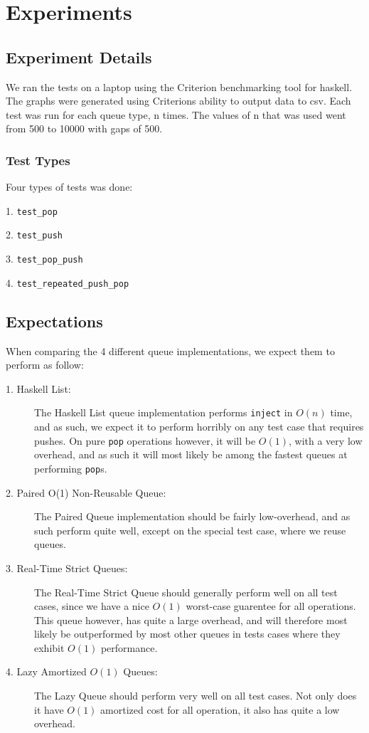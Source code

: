 \section{Experiments}
\subsection{Experiment Details}
We ran the tests on a laptop using the Criterion benchmarking tool for haskell. The graphs were generated using Criterions ability to output data to csv. Each test was run for each queue type, n times. The values of n that was used went from 500 to 10000 with gaps of 500.

\subsubsection{Test Types}
Four types of tests was done:
\begin{description}
\item{1. \texttt{test\_pop}}
\item{2. \texttt{test\_push}}
\item{3. \texttt{test\_pop\_push}}
\item{4. \texttt{test\_repeated\_push\_pop}}
\end{description}



\subsection{Expectations}
When comparing the 4 different queue implementations, we expect them to perform as follow:
\begin{description}

\item[1. Haskell List:]
The Haskell List queue implementation performs \texttt{inject} in $O(n)$ time, and as such, we expect it to perform horribly on any test case that requires pushes.
On pure \texttt{pop} operations however, it will be $O(1)$, with a very low overhead, and as such it will most likely be among the fastest queues at performing \texttt{pop}s.
\item[2. Paired O(1) Non-Reusable Queue:]
The Paired Queue implementation should be fairly low-overhead, and as such perform quite well, except on the special test case, where we reuse queues.
\item[3. Real-Time Strict Queues:] 
The Real-Time Strict Queue should generally perform well on all test cases, since we have a nice $O(1)$ worst-case guarentee for all operations. This queue however, has quite a large overhead, and will therefore most likely be outperformed by most other queues in tests cases where they exhibit $O(1)$ performance. 
\item[4. Lazy Amortized $O(1)$ Queues:]
The Lazy Queue should perform very well on all test cases. Not only does it have $O(1)$ amortized cost for all operation, it also has quite a low overhead. 

\end{description}

